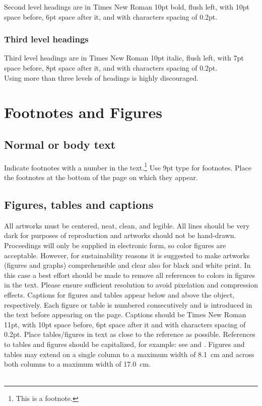 \documentclass[11pt]{article}
\begin{document}
Second level headings are in Times New Roman 10pt bold, flush left, with 10pt space before, 6pt space after it, and with characters spacing of 0.2pt.

\subsubsection{Third level headings}

Third level headings are in Times New Roman 10pt italic, flush left, with 7pt space before, 8pt space after it, and with characters spacing of 0.2pt.\\
Using more than three levels of headings is highly discouraged.


\section{Footnotes and Figures}

\subsection{Normal or body text}

Indicate footnotes with a number in the text.\footnote{This is a footnote.}
Use 9pt type for footnotes. Place the footnotes at the bottom of the page on which they appear.

\subsection{Figures, tables and captions}

All artworks must be centered, neat, clean, and legible.
All lines should be very dark for purposes of reproduction and artworks should not be hand-drawn.
Proceedings will only be supplied in electronic form, so color figures are acceptable. However, for sustainability reasons it is suggested to make artworks (figures and graphs) comprehensible and clear also for black and white print. In this case a best effort should be made to remove all references to colors in figures in the text.
Please ensure sufficient resolution to avoid pixelation and compression effects. Captions for figures and tables appear below and above the object, respectively.
Each figure or table is numbered consecutively and is introduced in the text before appearing on the page. Captions should be Times New Roman 11pt, with 10pt space before, 6pt space after it and with characters spacing of 0.2pt.
Place tables/figures in text as close to the reference as possible.
References to tables and figures should be capitalized, for example:
see  and .
Figures and tables may extend on a single column to a maximum width of \SI{8.1}{\centi\meter} and across both columns to a maximum width of \SI{17.0} {\centi\meter}.\\\\
\end{document}

